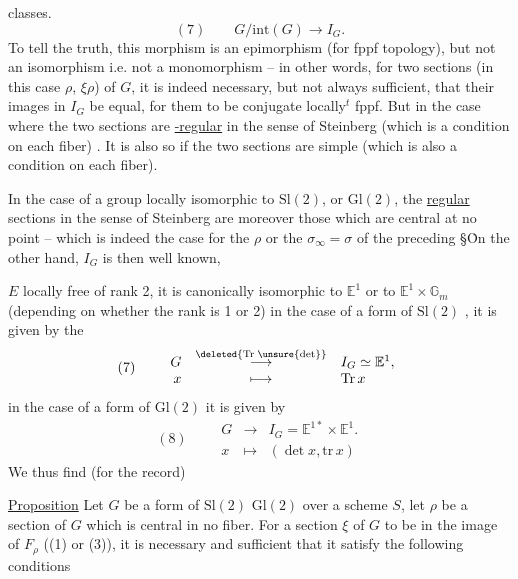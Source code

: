 classes.
\[
(7)\qquad G/\mathrm{int}(G)\longrightarrow I_G.
\]
To tell the truth,  this morphism is an epimorphism (for  fppf topology), but not an isomorphism i.e. not a monomorphism -- in other words, for two sections (in this case $\rho$, $\xi\rho$) of $G$, it is indeed necessary, but not always sufficient, that their images in $I_G$ be equal, for them to be conjugate locally$^{t}$ fppf. But in the case where the two sections are \uline{-regular} in the sense of Steinberg (which is a condition on each fiber)  . It is also so if the two sections are  simple (which is also a condition on each fiber).

In the case of a group locally isomorphic to $\mathrm{Sl}(2)$,  or $\mathrm{Gl}(2)$, the \uline{regular} sections in the sense of Steinberg are moreover those which are central at no point -- which is indeed the case for the $\rho$ or the $\sigma_\infty=\sigma$ of the preceding \S\. On the other hand, $I_G$ is then well known, 

$E$ locally free of rank 2, it is canonically isomorphic to $\mathbb E^1$ or to $\mathbb E^1\times\mathbb G_m$ (depending on whether the rank is 1 or 2) in the case of a form of $\mathrm{Sl}(2)$ , it is given by the \uline{}
\[
(7)\qquad
\begin{array}{rcl}
G&\overset{\deleted{\mathrm{Tr}\;\unsure{\det}}}{\longrightarrow}&I_G\simeq\mathbb E^1,\\
x&\longmapsto&\mathrm{Tr}\,x
\end{array}
\]
in the case of a form of $\mathrm{Gl}(2)$ it is given by
\[
(8)\qquad
\begin{array}{rcl}
G&\longrightarrow&I_G=\mathbb E^{1*}\times\mathbb E^1.\\
x&\longmapsto&(\det x,\mathrm{tr}\,x)
\end{array}
\]
We thus find (for the record)

\uline{Proposition} Let $G$ be a form of $\mathrm{Sl}(2)$  $\mathrm{Gl}(2)$ over a scheme $S$, let $\rho$ be a section of $G$ which is central in no fiber. For a section $\xi$ of $G$ to be  in the image of $F_\rho$ ((1) or (3)), it is necessary and sufficient that it satisfy the following conditions

